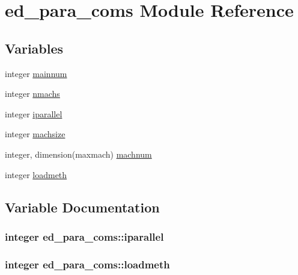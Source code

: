 \hypertarget{namespaceed__para__coms}{}\section{ed\+\_\+para\+\_\+coms Module Reference}
\label{namespaceed__para__coms}
\subsection*{Variables}
\begin{DoxyCompactItemize}
\item 
integer \hyperlink{namespaceed__para__coms_a1a6297adee3ed24d243e8acdc8a47ea9}{mainnum}
\item 
integer \hyperlink{namespaceed__para__coms_a19b6021232603bcc102754344756972d}{nmachs}
\item 
integer \hyperlink{namespaceed__para__coms_a86ef5c2ee27a88377558d7bce3256066}{iparallel}
\item 
integer \hyperlink{namespaceed__para__coms_ac54b6ab59f73c004e11f26ed942382c6}{machsize}
\item 
integer, dimension(maxmach) \hyperlink{namespaceed__para__coms_a38ed61f526634d9930f8f93a6a65cba4}{machnum}
\item 
integer \hyperlink{namespaceed__para__coms_a3ad2033c27d55eca30c6ce0e80c50274}{loadmeth}
\end{DoxyCompactItemize}


\subsection{Variable Documentation}
\subsubsection[{\texorpdfstring{iparallel}{iparallel}}]{\setlength{\rightskip}{0pt plus 5cm}integer ed\+\_\+para\+\_\+coms\+::iparallel}\hypertarget{namespaceed__para__coms_a86ef5c2ee27a88377558d7bce3256066}{}\label{namespaceed__para__coms_a86ef5c2ee27a88377558d7bce3256066}
\subsubsection[{\texorpdfstring{loadmeth}{loadmeth}}]{\setlength{\rightskip}{0pt plus 5cm}integer ed\+\_\+para\+\_\+coms\+::loadmeth}\hypertarget{namespaceed__para__coms_a3ad2033c27d55eca30c6ce0e80c50274}{}\label{namespaceed__para__coms_a3ad2033c27d55eca30c6ce0e80c50274}
